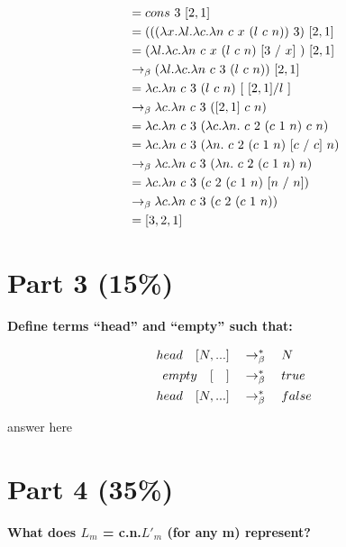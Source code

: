 \documentclass{article}
\begin{document}
	\begin{Large}
		\begin{align*}
			&= cons \ 3 \ [2,1]  \\
			&= (((\la x.\la l.\la c.\la n \ c \ x \ (l \ c \ n))\ 3) \ [2,1] \\
			&= (\la l.\la c.\la n \ c \ x \ (l \ c \ n) \ [3 \ / \ x] \ ) \ [2,1] \\
			&\equals (\la l.\la c.\la n \ c \ 3 \ (l \ c \ n)) \ [2,1] \\
			&= \la c.\la n \ c \ 3 \ (l \ c \ n) \ [ \ [2,1] / l \ ] \\
			&\equals \la c.\la n \ c \ 3 \ ([2,1] \ c \ n) \\
			&= \la c.\la n \ c \ 3 \ (\la c.\la n. \ c \ 2 \ (c \ 1 \ n) \ c \ n) \\
			&= \la c.\la n \ c \ 3 \ (\la n. \ c \ 2 \ (c \ 1 \ n) \ [c \ / \ c] \ n) \\
			&\equals \la c.\la n \ c \ 3 \ (\la n. \ c \ 2 \ (c \ 1 \ n) \ n) \\
			&= \la c.\la n \ c \ 3 \ ( c \ 2 \ (c \ 1 \ n) \ [n \ / \ n]) \\
			&\equals \la c.\la n \ c \ 3 \ ( c \ 2 \ (c \ 1 \ n)) \\
			&= [3,2,1]
		\end{align*}
	\end{Large}
	
	
	\section{Part 3 (15\%)}
	\textbf{Define terms ``head'' and ``empty'' such that:}
	
	\begin{align*}
		head \quad [ N, ...] &\quad \rightarrow_\beta^*\quad  N\\
		empty \quad [\quad] &\quad \rightarrow_\beta^*\quad true\\
		head \quad [ N, ...] &\quad \rightarrow_\beta^*\quad false
	\end{align*}
	
	answer here
	
	
	\section{Part 4 (35\%)}

	\textbf{What does $L_m$ = \lamb c.\lamb n.$L'_m$ (for any m) represent?}\\
	
\end{document}
